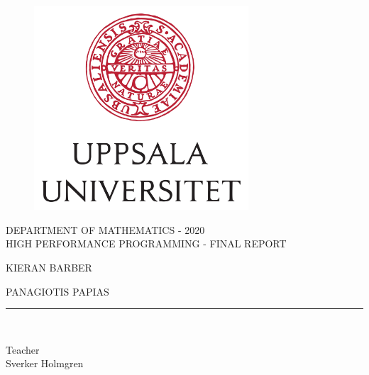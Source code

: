 \begin{titlepage}
  \begin{center}
      \vspace*{-1in}
      \begin{figure}[htb]
          \begin{center}
              \includegraphics[width=8cm]{../images/UU_logo.jpg}
          \end{center}
      \end{figure}
      DEPARTMENT OF MATHEMATICS - 2020\\
      \vspace*{0.15in}
      HIGH PERFORMANCE PROGRAMMING - FINAL REPORT\\
      \vspace*{0.3in}
      \begin{large}
          KIERAN BARBER\\
      \end{large}
      \vspace*{0.1in}
      \begin{Large}
          PANAGIOTIS PAPIAS\\
      \end{Large}
      \vspace*{0.1in}
      \rule{80mm}{0.1mm}\\
      \vspace*{0.1in}
      \begin{large}
          Teacher \\
          Sverker Holmgren
      \end{large}
  \end{center}
\end{titlepage}

